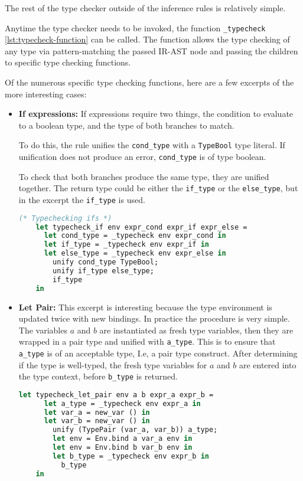 \documentclass{l4proj}
\begin{document}
The rest of the type checker outside of the inference rules is relatively simple.

Anytime the type checker needs to be invoked, the function \texttt{\_typecheck} \ref{lst:typecheck-function} can be called.
The function allows the type checking of any type via pattern-matching the passed IR-AST node and passing the children to specific type checking functions.

Of the numerous specific type checking functions, here are a few excerpts of the more interesting cases:
\begin{itemize}
    \item \textbf{If expressions:}
If expressions require two things, the condition to evaluate to a boolean type, and the type of both branches to match.

To do this, the rule unifies the \texttt{cond\_type} with a \texttt{TypeBool} type literal.
If unification does not produce an error, \texttt{cond\_type} is of type boolean.

To check that both branches produce the same type, they are unified together.
The return type could be either the \texttt{if\_type} or the \texttt{else\_type}, but in the excerpt the \texttt{if\_type} is used.
\begin{lstlisting}[language=Caml, caption=PyFunc Typechecker's typecheck\_if function. If no error is produced then the provided if-expression code is well-typed.]
    (* Typechecking ifs *)
    let typecheck_if env expr_cond expr_if expr_else = 
      let cond_type = _typecheck env expr_cond in
      let if_type = _typecheck env expr_if in 
      let else_type = _typecheck env expr_else in
        unify cond_type TypeBool;
        unify if_type else_type;
        if_type
    in
\end{lstlisting}



    \item \textbf{Let Pair:}
    This excerpt is interesting because the type environment is updated twice with new bindings.
    In practice the procedure is very simple.
    The variables $a$ and $b$ are instantiated as fresh type variables, then they are wrapped in a pair type and unified with \texttt{a\_type}.
    This is to ensure that \texttt{a\_type} is of an acceptable type, I.e, a pair type construct.
    After determining if the type is well-typed, the fresh type variables for $a$ and $b$ are entered into the type context, before \texttt{b\_type} is returned.
    \begin{lstlisting}[language=Caml, caption=PyFunc Typechecker's typecheck\_let\_pair function. If no error is produced then the provided let-pair code is well-typed.]
    let typecheck_let_pair env a b expr_a expr_b =
      let a_type = _typecheck env expr_a in
      let var_a = new_var () in
      let var_b = new_var () in
        unify (TypePair (var_a, var_b)) a_type;
        let env = Env.bind a var_a env in
        let env = Env.bind b var_b env in
        let b_type = _typecheck env expr_b in
          b_type
    in
    \end{lstlisting}




\end{itemize}
\end{document}
